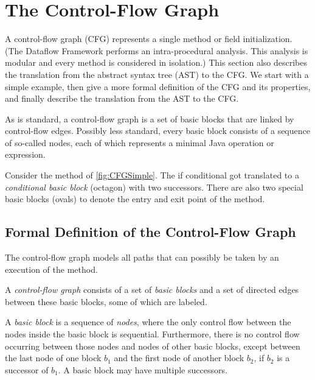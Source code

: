 \section{The Control-Flow Graph}
\label{sec:cfg}

A control-flow graph (CFG) represents a single method or field
initialization.  (The Dataflow Framework performs an intra-procedural
analysis.  This analysis is modular and every method is considered in
isolation.)
This section also describes the translation from the abstract syntax tree
(AST) to the CFG\@.
We start with a simple example, then give a more formal
definition of the CFG and its properties, and finally describe the
translation from the AST to the CFG.

As is standard, a control-flow graph is a set of
basic blocks that are linked by control-flow edges. Possibly less
standard, every basic block consists of a sequence of so-called nodes,
each of which represents a minimal Java operation or expression.



Consider the method  of \autoref{fig:CFGSimple}. The if
conditional got translated to a \emph{conditional basic block}
(octagon) with two successors. There are also two special basic blocks
(ovals) to denote the entry and exit point of the method.


\subsection{Formal Definition of the Control-Flow Graph}
\label{sec:cfg-formal}

The control-flow graph models all paths that can possibly be taken by an
execution of the method.

\begin{definition}
    A \emph{control-flow graph} consists of a set of \emph{basic
      blocks} and a set of directed edges between these basic blocks,
    some of which are labeled.
\end{definition}

\begin{definition}
    A \emph{basic block} is a sequence of \emph{nodes}, where the only
    control flow between the nodes inside
    the basic block is sequential.  Furthermore, there is no
    control flow occurring between those nodes and nodes of other basic
    blocks, except between the last node of one block $b_1$ and the first node
    of another block $b_2$, if $b_2$ is a successor of $b_1$.  A basic
    block may have multiple successors.
\end{definition}



